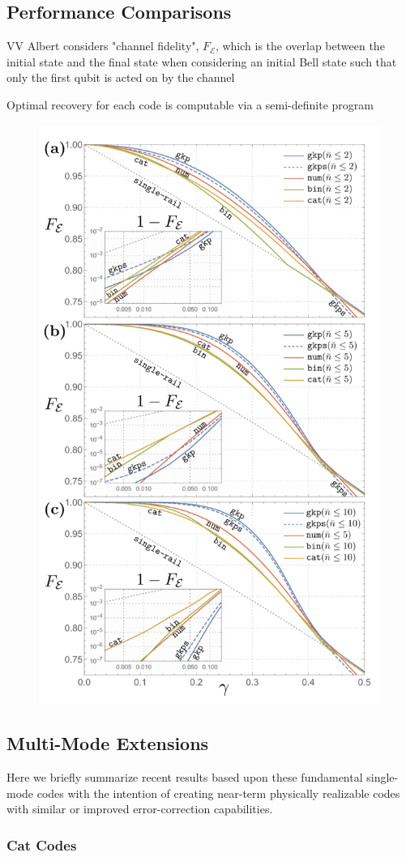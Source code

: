 \documentclass[12]{amsart}
\newcommand\0{\mathbf{0}}
\newcommand\<{\langle}
\renewcommand\>{\rangle}
\begin{document}
\subsection{Performance Comparisons}

VV Albert considers "channel fidelity", $F_\mathcal{E}$, which is the overlap between the initial state and the final state when considering an initial Bell state such that only the first qubit is acted on by the channel

Optimal recovery for each code is computable via a semi-definite program

\begin{figure}[H]
\centering
\includegraphics[width=0.5\linewidth,keepaspectratio]{fidelity.png}	
\end{figure}

\subsection{Multi-Mode Extensions}

Here we briefly summarize recent results based upon these fundamental single-mode codes with the intention of creating near-term physically realizable codes with similar or improved error-correction capabilities.

\subsubsection{Cat Codes}\label{sec:multi-cat}
\end{document}
